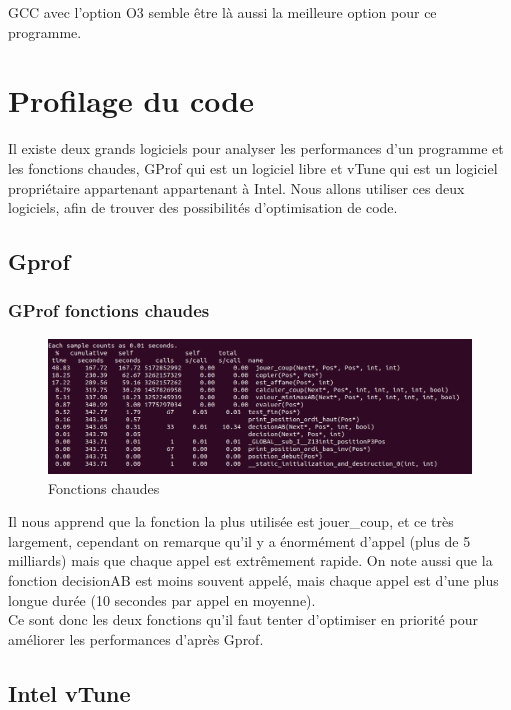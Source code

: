 \documentclass[
 aip,
 jmp,
 amsmath,amssymb,
 reprint
]{revtex4-1}
\begin{document}
GCC avec l'option O3 semble être là aussi la meilleure option pour ce programme.

\section{Profilage du code}

Il existe deux grands logiciels pour analyser les performances d'un programme et les fonctions chaudes, GProf qui est un logiciel libre et vTune qui est un logiciel propriétaire appartenant appartenant à Intel. Nous allons utiliser ces deux logiciels, afin de trouver des possibilités d'optimisation de code.

\subsection{Gprof}

\subsubsection{GProf fonctions chaudes}
\begin{figure}[H]
  \includegraphics[width=\linewidth, keepaspectratio=true]{gprof1.png}
  \caption{Fonctions chaudes\label{Fig:gprof_flat}}
\end{figure}

Il nous apprend que la fonction la plus utilisée est jouer\_coup, et ce très largement, cependant on remarque qu'il y a énormément d'appel (plus de 5 milliards) mais que chaque appel est extrêmement rapide. On note aussi que la fonction decisionAB est moins souvent appelé, mais chaque appel est d'une plus longue durée (10 secondes par appel en moyenne).\\
Ce sont donc les deux fonctions qu'il faut tenter d'optimiser en priorité pour améliorer les performances d'après Gprof.

\subsection{Intel vTune}
\end{document}
